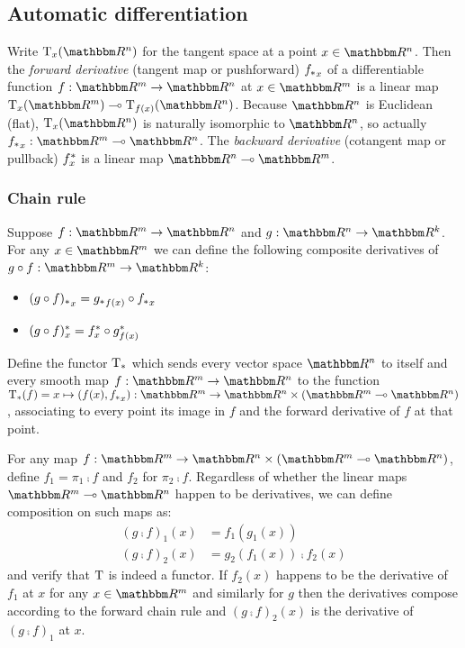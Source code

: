 \subsection{Automatic differentiation}

Write $\tangents_x(\RR^n)$ for the tangent space at a point $x \in \RR^n$. Then the \emph{forward derivative}
(tangent map or pushforward) ${f_{*}}_x$ of a differentiable function $f: \RR^m \to \RR^n$ at $x \in \RR^m$
is a linear map $\tangents_x(\RR^m) \linearto \tangents_{f(x)}(\RR^n)$. Because $\RR^n$ is Euclidean (flat),
$\tangents_x(\RR^n)$ is naturally isomorphic to $\RR^n$, so actually $\pushf{f}_x: \RR^m \linearto \RR^n$. The
\emph{backward derivative} (cotangent map or pullback) $f^{*}_x$  is a linear map $\RR^n \linearto \RR^m$.

\subsubsection{Chain rule}

Suppose $f: \RR^m \to \RR^n$ and $g: \RR^n \to \RR^k$. For any $x \in \RR^m$ we can define the following
composite derivatives of $g \comp f: \RR^m \to \RR^k$:

\begin{itemize}
\item ${(g \circ f)_{*}}_x = {g_{*}}_{f(x)} \circ {f_{*}}_x$
\item $(g \circ f)^{*}_x = f^{*}_{x} \circ g^{*}_{f(x)}$
\end{itemize}

\begin{definition}
Define the functor $\mathrm{T}_*$ which sends every vector space $\RR^n$ to itself and every smooth map $f:
\RR^m \to \RR^n$ to the function $\tangents_*(f) = x \mapsto (f(x), \pushf{f}_x): \RR^m \to \RR^n \times (\RR^m
\linearto \RR^n)$, associating to every point its image in $f$ and the forward derivative of $f$ at that
point.
\end{definition}

For any map $f: \RR^m \to \RR^n \times (\RR^m \linearto \RR^n)$, define $f_1 = \pi_1 \comp f$ and $f_2$ for
$\pi_2 \comp f$. Regardless of whether the linear maps $\RR^m \linearto \RR^n$ happen to be derivatives, we
can define composition on such maps as:
\begin{align*}
(g \comp f)_1(x) &= f_1(g_1(x)) \\
(g \comp f)_2(x) &= g_2(f_1(x)) \comp f_2(x)
\end{align*}
\noindent and verify that $\mathrm{T}$ is indeed a functor. If $f_2(x)$ happens to be the derivative of $f_1$
at $x$ for any $x \in \RR^m$ and similarly for $g$ then the derivatives compose according to the forward chain
rule and $(g \comp f)_2(x)$ is the derivative of $(g \comp f)_1$ at $x$.

